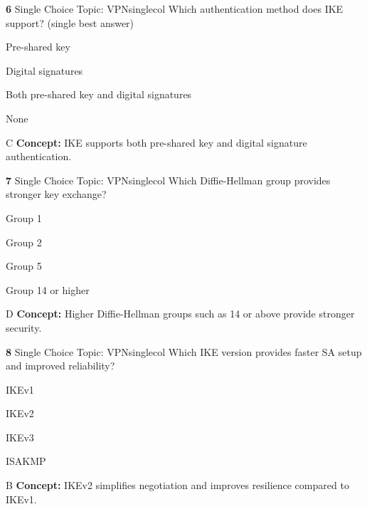 \documentclass[10pt,a4paper]{article}
\begin{document}
\begin{qcard}{\color{white}\textbf{6} \hfill \small Single Choice \textbar{} Topic: VPN}{singlecol}
Which authentication method does IKE support? (single best answer)

\begin{qoptions}
\item Pre-shared key
\item Digital signatures
\item Both pre-shared key and digital signatures
\item None
\end{qoptions}
\begin{explainbox}{C}
\textbf{Concept:} IKE supports both pre-shared key and digital signature authentication.
\end{explainbox}
\end{qcard}

\begin{qcard}{\color{white}\textbf{7} \hfill \small Single Choice \textbar{} Topic: VPN}{singlecol}
Which Diffie-Hellman group provides stronger key exchange?

\begin{qoptions}
\item Group 1
\item Group 2
\item Group 5
\item Group 14 or higher
\end{qoptions}
\begin{explainbox}{D}
\textbf{Concept:} Higher Diffie-Hellman groups such as 14 or above provide stronger security.
\end{explainbox}
\end{qcard}

\begin{qcard}{\color{white}\textbf{8} \hfill \small Single Choice \textbar{} Topic: VPN}{singlecol}
Which IKE version provides faster SA setup and improved reliability?

\begin{qoptions}
\item IKEv1
\item IKEv2
\item IKEv3
\item ISAKMP
\end{qoptions}
\begin{explainbox}{B}
\textbf{Concept:} IKEv2 simplifies negotiation and improves resilience compared to IKEv1.
\end{explainbox}
\end{qcard}
\end{document}
